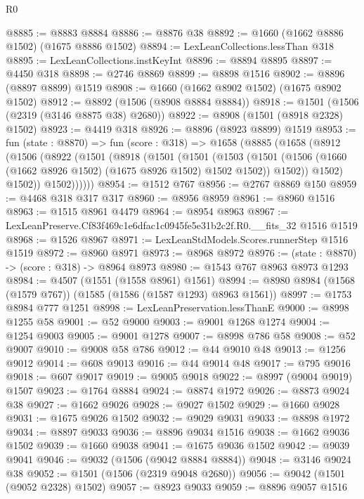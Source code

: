 \begin{lexlean}{R0}
\begin{coremodule}
@8885 := @8883 @8884
@8886 := @8876 @38
@8892 := @1660 (@1662 @8886 @1502) (@1675 @8886 @1502)
@8894 := LexLeanCollections.lessThan @318
@8895 := LexLeanCollections.instKeyInt
@8896 := @8894 @8895
@8897 := @4450 @318
@8898 := @2746 @8869
@8899 := @8898 @1516
@8902 := @8896 (@8897 @8899) @1519
@8908 := @1660 (@1662 @8902 @1502) (@1675 @8902 @1502)
@8912 := @8892 (@1506 (@8908 @8884 @8884))
@8918 := @1501 (@1506 (@2319 (@3146 @8875 @38) @2680))
@8922 := @8908 (@1501 (@8918 @2328) @1502)
@8923 := @4419 @318
@8926 := @8896 (@8923 @8899) @1519
@8953 := fun (state : @8870) =>
  fun (score : @318) =>
  @1658
    (@8885
      (@1658
        (@8912
          (@1506
            (@8922
              (@1501
                (@8918
                  (@1501
                    (@1501
                      (@1503
                        (@1501
                          (@1506 (@1660 (@1662 @8926 @1502) (@1675 @8926 @1502) @1502 @1502))
                          @1502))
                      @1502)
                    @1502))
                @1502))))))
@8954 := @1512 @767
@8956 := @2767 @8869 @150
@8959 := @4468 @318 @317 @317
@8960 := @8956 @8959
@8961 := @8960 @1516
@8963 := @1515 @8961 @4479
@8964 := @8954 @8963
@8967 := LexLeanPreserve.Cf83f469c1e6dfac1c0945fe5e31b2c2f.R0.__fits_32 @1516 @1519
@8968 := @1526 @8967
@8971 := LexLeanStdModels.Scores.runnerStep @1516 @1519
@8972 := @8960 @8971
@8973 := @8968 @8972
@8976 := (state : @8870) -> (score : @318) -> @8964 @8973
@8980 := @1543 @767 @8963 @8973 @1293
@8984 := @4507 (@1551 (@1558 @8961) @1561)
@8994 := @8980 @8984 (@1568 (@1579 @767)) (@1585 (@1586 (@1587 @1293) @8963 @1561))
@8997 := @1753 @8984 @777 @1251
@8998 := LexLeanPreservation.lessThanE
@9000 := @8998 @1255 @58
@9001 := @52 @9000
@9003 := @9001 @1268 @1274
@9004 := @1254 @9003
@9005 := @9001 @1278
@9007 := @8998 @786 @58
@9008 := @52 @9007
@9010 := @9008 @58 @786
@9012 := @44 @9010 @48
@9013 := @1256 @9012
@9014 := @608 @9013
@9016 := @44 @9014 @48
@9017 := @795 @9016
@9018 := @607 @9017
@9019 := @9005 @9018
@9022 := @8997 (@9004 @9019) @1507
@9023 := @1764 @8884
@9024 := @8874 @1972
@9026 := @8873 @9024 @38
@9027 := @1662 @9026
@9028 := @9027 @1502
@9029 := @1660 @9028
@9031 := @1675 @9026 @1502
@9032 := @9029 @9031
@9033 := @8898 @1972
@9034 := @8897 @9033
@9036 := @8896 @9034 @1516
@9038 := @1662 @9036 @1502
@9039 := @1660 @9038
@9041 := @1675 @9036 @1502
@9042 := @9039 @9041
@9046 := @9032 (@1506 (@9042 @8884 @8884))
@9048 := @3146 @9024 @38
@9052 := @1501 (@1506 (@2319 @9048 @2680))
@9056 := @9042 (@1501 (@9052 @2328) @1502)
@9057 := @8923 @9033
@9059 := @8896 @9057 @1516

\end{coremodule}
\end{lexlean}
